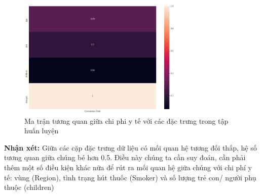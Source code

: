 \documentclass{article}
\begin{document}
	\begin{figure}[H]
		\centering
		\includegraphics[width=0.7\textwidth]{images/corr_charges_other_features.png}
		\caption{Ma trận tương quan giữa chi phi y tế với các đặc trưng trong tập huấn luyện}
		\label{fig:writing-thesis-corr-charges-other-features}
	\end{figure}
	\textbf{Nhận xét:} Giữa các cặp đặc trưng dữ liệu có mối quan hệ tương đối thấp, hệ số tương quan giữa chúng bé hơn 0.5. Điều này chúng ta cần suy đoán, cần phải thêm một số điều kiện khác nữa để rút ra mối quan hệ giữa chúng với chi phí y tế: vùng (Region), tình trạng hút thuốc (Smoker) và số lượng trẻ con/ người phụ thuộc (children)
	
\end{document}
